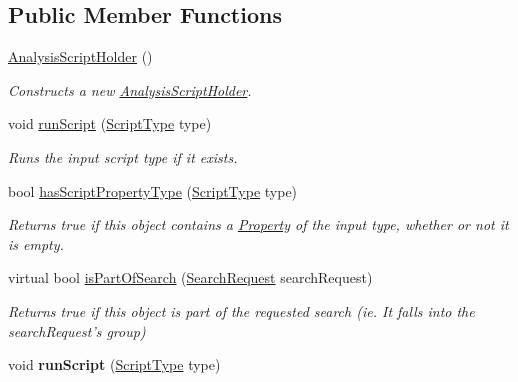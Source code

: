 \subsection*{Public Member Functions}
\begin{DoxyCompactItemize}
\item 
\hyperlink{class_picto_1_1_analysis_script_holder_a89065a594ecf7740b50e5dfc54ea80c2}{Analysis\-Script\-Holder} ()
\begin{DoxyCompactList}\small\item\em Constructs a new \hyperlink{class_picto_1_1_analysis_script_holder}{Analysis\-Script\-Holder}. \end{DoxyCompactList}\item 
\hypertarget{class_picto_1_1_analysis_script_holder_aed0746382fb977857a020e81e9dcaa8e}{void \hyperlink{class_picto_1_1_analysis_script_holder_aed0746382fb977857a020e81e9dcaa8e}{run\-Script} (\hyperlink{class_picto_1_1_analysis_script_holder_adb6ac71422633de2c46dc223551338d8}{Script\-Type} type)}\label{class_picto_1_1_analysis_script_holder_aed0746382fb977857a020e81e9dcaa8e}

\begin{DoxyCompactList}\small\item\em Runs the input script type if it exists. \end{DoxyCompactList}\item 
\hypertarget{class_picto_1_1_analysis_script_holder_ab70342310801b98348c0eb44b02531a5}{bool \hyperlink{class_picto_1_1_analysis_script_holder_ab70342310801b98348c0eb44b02531a5}{has\-Script\-Property\-Type} (\hyperlink{class_picto_1_1_analysis_script_holder_adb6ac71422633de2c46dc223551338d8}{Script\-Type} type)}\label{class_picto_1_1_analysis_script_holder_ab70342310801b98348c0eb44b02531a5}

\begin{DoxyCompactList}\small\item\em Returns true if this object contains a \hyperlink{class_picto_1_1_property}{Property} of the input type, whether or not it is empty. \end{DoxyCompactList}\item 
virtual bool \hyperlink{class_picto_1_1_analysis_script_holder_ac4c0788def2bb19c831a64d56cc199d7}{is\-Part\-Of\-Search} (\hyperlink{struct_search_request}{Search\-Request} search\-Request)
\begin{DoxyCompactList}\small\item\em Returns true if this object is part of the requested search (ie. It falls into the search\-Request's group) \end{DoxyCompactList}\item 
\hypertarget{class_picto_1_1_analysis_script_holder_aed0746382fb977857a020e81e9dcaa8e}{void {\bfseries run\-Script} (\hyperlink{class_picto_1_1_analysis_script_holder_adb6ac71422633de2c46dc223551338d8}{Script\-Type} type)}\label{class_picto_1_1_analysis_script_holder_aed0746382fb977857a020e81e9dcaa8e}


\end{DoxyCompactItemize}
